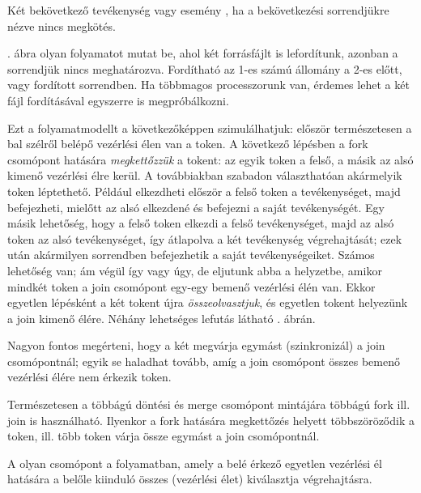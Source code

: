 \begin{definicio}
Két bekövetkező tevékenység vagy esemény , ha a bekövetkezési sorrendjükre nézve nincs megkötés.
\end{definicio} 

\begin{pelda}
. ábra olyan folyamatot mutat be, ahol két forrásfájlt is lefordítunk, azonban a sorrendjük nincs meghatározva. Fordítható az 1-es számú állomány a 2-es előtt, vagy fordított sorrendben. Ha többmagos processzorunk van, érdemes lehet a két fájl fordításával egyszerre is megpróbálkozni.

Ezt a folyamatmodellt a következőképpen szimulálhatjuk: először természetesen a bal szélről belépő vezérlési élen van a token. A következő lépésben a fork csomópont hatására \emph{megkettőzzük} a tokent: az egyik token a felső, a másik az alsó kimenő vezérlési élre kerül. A továbbiakban szabadon választhatóan akármelyik token léptethető. Például elkezdheti először a felső token a tevékenységet, majd befejezheti, mielőtt az alsó elkezdené és befejezni a saját tevékenységét. Egy másik lehetőség, hogy a felső token elkezdi a felső tevékenységet, majd az alsó token az alsó tevékenységet, így átlapolva a két tevékenység végrehajtását; ezek után akármilyen sorrendben befejezhetik a saját tevékenységeiket. Számos lehetőség van; ám végül így vagy úgy, de eljutunk abba a helyzetbe, amikor mindkét token a join csomópont egy-egy bemenő vezérlési élén van. Ekkor egyetlen lépésként a két tokent újra \emph{összeolvasztjuk}, és egyetlen tokent helyezünk a join kimenő élére. Néhány lehetséges lefutás látható . ábrán.
\end{pelda}

Nagyon fontos megérteni, hogy a két  megvárja egymást (szinkronizál) a join csomópontnál; egyik se haladhat tovább, amíg a join csomópont összes bemenő vezérlési élére nem érkezik token. 

Természetesen a többágú döntési és merge csomópont mintájára többágú fork ill. join is használható. Ilyenkor a fork hatására megkettőzés helyett többszöröződik a token, ill. több token várja össze egymást a join csomópontnál.
 
 \begin{definicio}
	A  olyan csomópont a folyamatban, amely a belé érkező egyetlen vezérlési él hatására a belőle kiinduló összes  (vezérlési élet) kiválasztja végrehajtásra.
\end{definicio}
 
